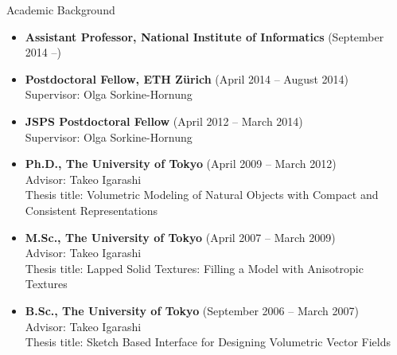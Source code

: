 {\Large\sc Academic Background}
\vspace{-3mm}
\begin{itemize}
\item {\bf Assistant Professor, National Institute of Informatics} (September 2014 --)

\item {\bf Postdoctoral Fellow, ETH Z\"{u}rich} (April 2014 -- August 2014)\\
Supervisor: Olga Sorkine-Hornung

\item {\bf JSPS Postdoctoral Fellow} (April 2012 -- March 2014)\\
Supervisor: Olga Sorkine-Hornung

\item {\bf Ph.D., The University of Tokyo} (April 2009 -- March 2012)\\
Advisor: Takeo Igarashi\\
Thesis title: Volumetric Modeling of Natural Objects with Compact and Consistent Representations

\item {\bf M.Sc., The University of Tokyo} (April 2007 -- March 2009)\\
Advisor: Takeo Igarashi\\
Thesis title: Lapped Solid Textures: Filling a Model with Anisotropic Textures

\item {\bf B.Sc., The University of Tokyo} (September 2006 -- March 2007)\\
Advisor: Takeo Igarashi\\
Thesis title: Sketch Based Interface for Designing Volumetric Vector Fields
\end{itemize}
